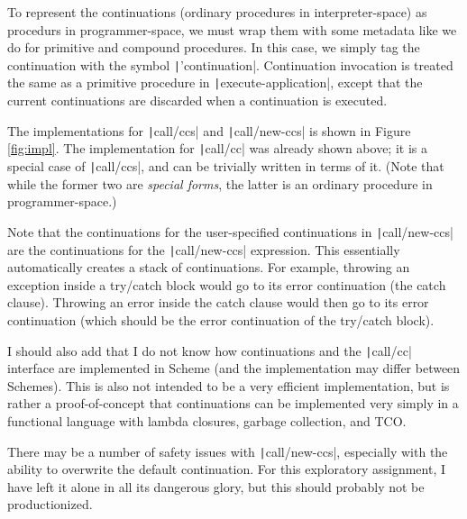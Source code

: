 \documentclass[]{article}
\begin{document}
To represent the continuations (ordinary procedures in interpreter-space) as procedurs in programmer-space, we must wrap them with some metadata like we do for primitive and compound procedures. In this case, we simply tag the continuation with the symbol \texttt|'continuation|. Continuation invocation is treated the same as a primitive procedure in \texttt|execute-application|, except that the current continuations are discarded when a continuation is executed.

The implementations for \texttt|call/ccs| and \texttt|call/new-ccs| is shown in Figure \ref{fig:impl}. The implementation for \texttt|call/cc| was already shown above; it is a special case of \texttt|call/ccs|, and can be trivially written in terms of it. (Note that while the former two are \textit{special forms}, the latter is an ordinary procedure in programmer-space.)

Note that the continuations for the user-specified continuations in \texttt|call/new-ccs| are the continuations for the \texttt|call/new-ccs| expression. This essentially automatically creates a stack of continuations. For example, throwing an exception inside a try/catch block would go to its error continuation (the catch clause). Throwing an error inside the catch clause would then go to its error continuation (which should be the error continuation of the try/catch block).

I should also add that I do not know how continuations and the \texttt|call/cc| interface are implemented in Scheme (and the implementation may differ between Schemes). This is also not intended to be a very efficient implementation, but is rather a proof-of-concept that continuations can be implemented very simply in a functional language with lambda closures, garbage collection, and TCO.

There may be a number of safety issues with \texttt|call/new-ccs|, especially with the ability to overwrite the default continuation. For this exploratory assignment, I have left it alone in all its dangerous glory, but this should probably not be productionized.
\end{document}
